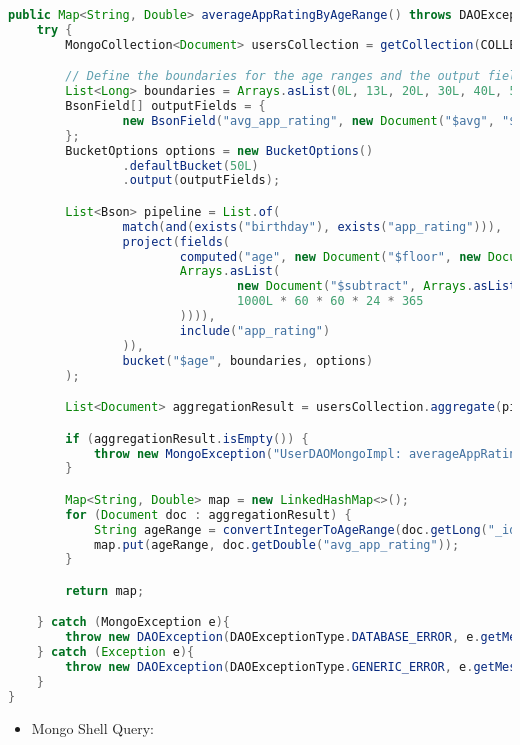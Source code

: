 \begin{mdframed}[style=customstyle]
\begin{lstlisting}[language=java]
public Map<String, Double> averageAppRatingByAgeRange() throws DAOException {
    try {
        MongoCollection<Document> usersCollection = getCollection(COLLECTION_NAME);

        // Define the boundaries for the age ranges and the output fields
        List<Long> boundaries = Arrays.asList(0L, 13L, 20L, 30L, 40L, 50L);
        BsonField[] outputFields = {
                new BsonField("avg_app_rating", new Document("$avg", "$app_rating"))
        };
        BucketOptions options = new BucketOptions()
                .defaultBucket(50L)
                .output(outputFields);

        List<Bson> pipeline = List.of(
                match(and(exists("birthday"), exists("app_rating"))),
                project(fields(
                        computed("age", new Document("$floor", new Document("$divide",
                        Arrays.asList(
                                new Document("$subtract", Arrays.asList(new Date(), "$birthday")),
                                1000L * 60 * 60 * 24 * 365
                        )))),
                        include("app_rating")
                )),
                bucket("$age", boundaries, options)
        );

        List<Document> aggregationResult = usersCollection.aggregate(pipeline).into(new ArrayList<>());

        if (aggregationResult.isEmpty()) {
            throw new MongoException("UserDAOMongoImpl: averageAppRatingByAgeRange: No data found");
        }

        Map<String, Double> map = new LinkedHashMap<>();
        for (Document doc : aggregationResult) {
            String ageRange = convertIntegerToAgeRange(doc.getLong("_id"));
            map.put(ageRange, doc.getDouble("avg_app_rating"));
        }

        return map;

    } catch (MongoException e){
        throw new DAOException(DAOExceptionType.DATABASE_ERROR, e.getMessage());
    } catch (Exception e){
        throw new DAOException(DAOExceptionType.GENERIC_ERROR, e.getMessage());
    }
}\end{lstlisting}
\end{mdframed}
    
\newpage

\begin{itemize}
    \item Mongo Shell Query:
\end{itemize}

